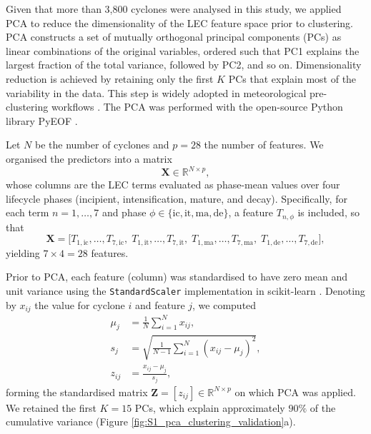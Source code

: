 \documentclass[pdflatex,sn-chicago]{sn-jnl}%
\theoremstyle{plain}
\theoremstyle{definition}
\theoremstyle{remark}
\theoremstyle{definition}
\begin{document}
Given that more than 3{,}800 cyclones were analysed in this study, we applied PCA to reduce the dimensionality of the LEC feature space prior to clustering. PCA constructs a set of mutually orthogonal principal components (PCs) as linear combinations of the original variables, ordered such that PC1 explains the largest fraction of the total variance, followed by PC2, and so on. Dimensionality reduction is achieved by retaining only the first $K$ PCs that explain most of the variability in the data. This step is widely adopted in meteorological pre-clustering workflows \citep[e.g.,][]{camus2014,de2022hybrid,borato2024evaluation,pozo2025characterising,zhong2025advanced}. The PCA was performed with the open-source Python library PyEOF \citep{zheng_2021}.

Let $N$ be the number of cyclones and $p=28$ the number of features. We organised the predictors into a matrix
\begin{equation}
\mathbf{X} \in \mathbb{R}^{N \times p},
\end{equation}
whose columns are the LEC terms evaluated as phase-mean values over four lifecycle phases (incipient, intensification, mature, and decay). Specifically, for each term $n=1,\ldots,7$ and phase $\phi \in \{\mathrm{ic},\mathrm{it},\mathrm{ma},\mathrm{de}\}$, a feature $T_{n,\phi}$ is included, so that
\begin{equation}
\mathbf{X} = \big[T_{1,\mathrm{ic}}, \ldots, T_{7,\mathrm{ic}},\;
               T_{1,\mathrm{it}}, \ldots, T_{7,\mathrm{it}},\;
               T_{1,\mathrm{ma}}, \ldots, T_{7,\mathrm{ma}},\;
               T_{1,\mathrm{de}}, \ldots, T_{7,\mathrm{de}}\big],
\end{equation}
yielding $7 \times 4 = 28$ features.

Prior to PCA, each feature (column) was standardised to have zero mean and unit variance using the \texttt{StandardScaler} implementation in scikit-learn \citep{pedregosa2011scikit}. Denoting by $x_{ij}$ the value for cyclone $i$ and feature $j$, we computed
\begin{align}
\mu_j &= \frac{1}{N}\sum_{i=1}^{N} x_{ij},\\
s_j  &= \sqrt{\frac{1}{N-1}\sum_{i=1}^{N} (x_{ij}-\mu_j)^2},\\
z_{ij} &= \frac{x_{ij}-\mu_j}{s_j},
\end{align}
forming the standardised matrix $\mathbf{Z}=[z_{ij}] \in \mathbb{R}^{N \times p}$ on which PCA was applied. We retained the first $K=15$ PCs, which explain approximately $90\%$ of the cumulative variance (Figure \ref{fig:S1_pca_clustering_validation}a).
\end{document}
